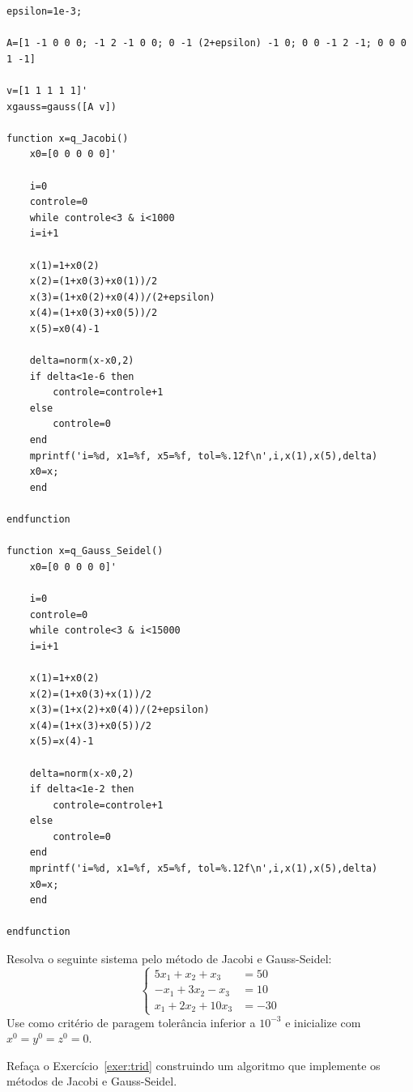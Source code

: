 \begin{resp}
  
\ifisscilab
\begin{verbatim}
epsilon=1e-3;

A=[1 -1 0 0 0; -1 2 -1 0 0; 0 -1 (2+epsilon) -1 0; 0 0 -1 2 -1; 0 0 0 1 -1]

v=[1 1 1 1 1]'
xgauss=gauss([A v])

function x=q_Jacobi()
    x0=[0 0 0 0 0]'

    i=0
    controle=0
    while controle<3 & i<1000
    i=i+1

    x(1)=1+x0(2)
    x(2)=(1+x0(3)+x0(1))/2
    x(3)=(1+x0(2)+x0(4))/(2+epsilon)
    x(4)=(1+x0(3)+x0(5))/2
    x(5)=x0(4)-1

    delta=norm(x-x0,2)
    if delta<1e-6 then
        controle=controle+1
    else
        controle=0
    end
    mprintf('i=%d, x1=%f, x5=%f, tol=%.12f\n',i,x(1),x(5),delta)
    x0=x;
    end

endfunction

function x=q_Gauss_Seidel()
    x0=[0 0 0 0 0]'

    i=0
    controle=0
    while controle<3 & i<15000
    i=i+1

    x(1)=1+x0(2)
    x(2)=(1+x0(3)+x(1))/2
    x(3)=(1+x(2)+x0(4))/(2+epsilon)
    x(4)=(1+x(3)+x0(5))/2
    x(5)=x(4)-1

    delta=norm(x-x0,2)
    if delta<1e-2 then
        controle=controle+1
    else
        controle=0
    end
    mprintf('i=%d, x1=%f, x5=%f, tol=%.12f\n',i,x(1),x(5),delta)
    x0=x;
    end

endfunction
\end{verbatim}    
\fi
  
\end{resp}

\begin{exer}
Resolva o seguinte sistema pelo método de Jacobi e Gauss-Seidel:
$$\left\{\begin{array}{ll}
5x_1+x_2+x_3&=50\\
-x_1+3x_2-x_3&=10\\
x_1+2x_2+10x_3&=-30
\end{array}\right.$$
Use como critério de paragem tolerância inferior a $10^{-3}$ e inicialize com $x^{0}=y^{0}=z^{0}=0$.  
\end{exer}

\begin{exer}Refaça o Exercício~\ref{exer:trid} construindo um algoritmo que implemente os métodos de Jacobi e Gauss-Seidel.
\end{exer}

